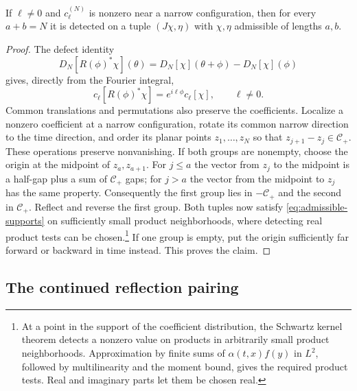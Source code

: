 \documentclass[11pt, letterpaper, reqno]{amsart}
\theoremstyle{definition}
\newenvironment{lemma}
{\pushQED{\qed}\renewcommand{\qedsymbol}{$\blacksquare$}\lemmax}
{\popQED\endlemmax}
\theoremstyle{remark}
\newcommand{\calC}{\mathcal{C}}
\begin{document}
\begin{lemma}\label{lem:testing}
If $\ell\neq0$ and $c_\ell^{(N)}$ is nonzero near a narrow
configuration, then for every $a+b=N$ it is detected on a tuple
$(J\chi,\eta)$ with $\chi,\eta$ admissible of lengths $a,b$.
\end{lemma}
\begin{proof}
The defect identity
\begin{equation}
 D_N[R(\phi)^*\chi](\theta)
   =D_N[\chi](\theta+\phi)-D_N[\chi](\phi)
\end{equation}
gives, directly from the Fourier integral,
\begin{equation}\label{eq:coefficient-rotation}
 c_\ell[R(\phi)^*\chi]=e^{i\ell\phi}c_\ell[\chi],
 \qquad\ell\neq0.
\end{equation}
Common translations and permutations also preserve the coefficients.
Localize a nonzero coefficient at a narrow configuration, rotate its
common narrow direction to the time direction, and order its planar
points $z_1,\ldots,z_N$ so that $z_{j+1}-z_j\in\calC_+$.
These operations preserve nonvanishing. If both groups are nonempty,
choose the origin at the
midpoint of $z_a,z_{a+1}$. For $j\leq a$ the vector from $z_j$ to
the midpoint is a half-gap plus a sum of $\calC_+$ gaps; for $j>a$
the vector from the midpoint to $z_j$ has the same property.
Consequently the first group lies in $-\calC_+$ and the second in
$\calC_+$. Reflect and reverse the first group. Both tuples now
satisfy \eqref{eq:admissible-supports} on sufficiently small product
neighborhoods, where detecting real product tests can be chosen.\footnote{At a
point in the support of the coefficient distribution, the Schwartz
kernel theorem detects a nonzero value on products in arbitrarily
small product neighborhoods. Approximation by finite sums of
$\alpha(t,x)f(y)$ in $L^2$, followed by multilinearity and the
moment bound, gives the required product tests. Real and imaginary
parts let them be chosen real.}
If one group is empty, put the origin sufficiently far forward or
backward in time instead. This proves the claim.
\end{proof}

\subsection{The continued reflection pairing}\label{subsec:continued-pairing}
\end{document}
